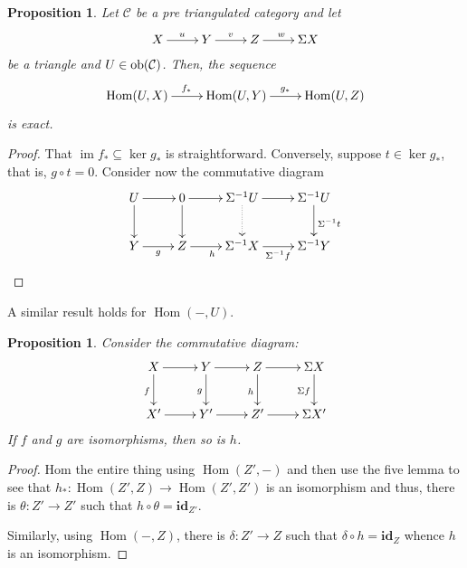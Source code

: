 \documentclass{amsart}
\theoremstyle{thmstyle}
\newtheorem{proposition}[theorem]{Proposition}
\theoremstyle{defstyle}
\newcommand{\im}{\operatorname{im}}
\newcommand{\id}{\mathbf{id}}
\newcommand{\Hom}{\operatorname{Hom}}
\begin{document}
\begin{proposition}
    Let $\mathcal C$ be a pre triangulated category and let 
    \begin{equation*}
        \xymatrix {
            X\ar[r]^u & Y\ar[r]^v & Z\ar[r]^w & \Sigma X
        }
    \end{equation*}
    be a triangle and $U\in\operatorname{ob}(\mathcal C)$. Then, the sequence 
    \begin{equation*}
        \xymatrix {
            \Hom(U,X)\ar[r]^{f_\ast} & \Hom(U,Y)\ar[r]^{g_\ast} & \Hom(U,Z)
        }
    \end{equation*}
    is exact.
\end{proposition}
\begin{proof}
    That $\im f_\ast\subseteq\ker g_\ast$ is straightforward. Conversely, suppose $t\in\ker g_\ast$, that is, $g\circ t = 0$. Consider now the commutative diagram 
    \begin{equation*}
        \xymatrix {
            U\ar[r]\ar[d] & 0\ar[r]\ar[d] & \Sigma^{-1}U\ar[r]\ar@{.>}[d] & \Sigma^{-1}U\ar[d]^{\Sigma^{-1}t}\\
            Y\ar[r]_g & Z\ar[r]_h & \Sigma^{-1}X\ar[r]_{\Sigma^{-1}f} & \Sigma^{-1}Y
        }
    \end{equation*}
\end{proof}

A similar result holds for $\Hom(-,U)$.

\begin{proposition}
    Consider the commutative diagram: 
    \begin{equation*}
        \xymatrix {
            X\ar[d]_f\ar[r] & Y\ar[d]_g\ar[r] & Z\ar[d]_h\ar[r] & \Sigma X\ar[d]_{\Sigma f}\\
            X'\ar[r] & Y'\ar[r] & Z'\ar[r] & \Sigma X'
        }
    \end{equation*}
    If $f$ and $g$ are isomorphisms, then so is $h$.
\end{proposition}
\begin{proof}
    Hom the entire thing using $\Hom(Z',-)$ and then use the five lemma to see that $h_\ast: \Hom(Z',Z)\to\Hom(Z',Z')$ is an isomorphism and thus, there is $\theta: Z'\to Z'$ such that $h\circ\theta = \id_{Z'}$.

    Similarly, using $\Hom(-,Z)$, there is $\delta: Z'\to Z$ such that $\delta\circ h = \id_Z$ whence $h$ is an isomorphism.
\end{proof}

\newcommand{\cone}{\operatorname{cone}}
\end{document}
